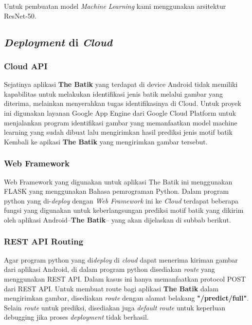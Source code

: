   Untuk pembuatan model \textit{Machine Learning} kami menggunakan arsitektur ResNet-50.
  
  \subsection{\textit{Deployment} di \textit{Cloud}}
    
    \subsubsection{Cloud API}

    Sejatinya aplikasi \textbf{The Batik} yang terdapat di device Android tidak memiliki kapabilitas untuk melakukan identifikasi jenis batik melalui gambar yang diterima, melainkan menyerahkan tugas identifikasinya di Cloud.
    Untuk proyek ini digunakan layanan Google App Engine dari Google Cloud Platform untuk menjalankan program identifikasi gambar yang memanfaatkan model machine learning yang sudah dibuat lalu mengirimkan hasil prediksi jenis motif batik Kembali ke apikasi \textbf{The Batik} yang mengirimkan gambar tersebut.

    \subsubsection{Web Framework}

    Web Framework yang digunakan untuk aplikasi The Batik ini menggunakan FLASK yang menggunakan Bahasa pemrograman Python. Dalam program python yang di-\textit{deploy} dengan \textit{Web Framework} ini ke \textit{Cloud} terdapat beberapa fungsi yang digunakan untuk keberlangsungan prediksi motif batik yang dikirim oleh aplikasi Android--\textbf{The Batik}-- yang akan dijelaskan di subbab berikut.
    
    \subsubsection{REST API Routing}
    
    Agar program python yang di\textit{deploy} di \textit{cloud} dapat menerima kiriman gambar dari aplikasi Android, di dalam program python disediakan \textit{route} yang menggunakan REST API.
    Dalam kasus ini hanya memanfaatkan protocol POST dari REST API.
    Untuk membuat route bagi aplikasi \textbf{The Batik} dalam mengirimkan gambar, disediakan \textit{route} dengan alamat belakang \textbf{"/predict/full"}.
    Selain \textit{route} untuk prediksi, disediakan juga \textit{default route} untuk keperluan debugging jika proses \textit{deployment} tidak berhasil.

